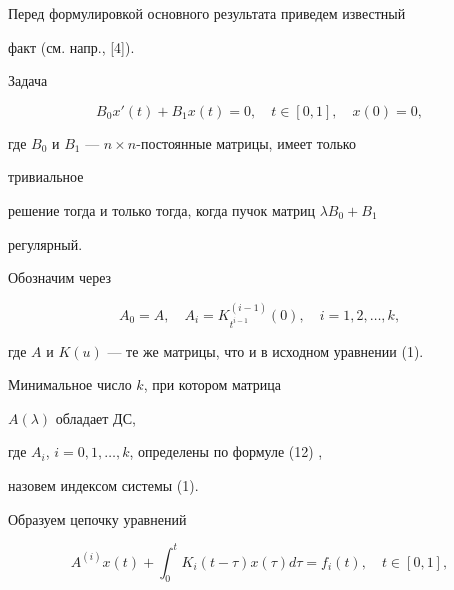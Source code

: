 Перед формулировкой основного результата приведем известный 


факт (см. напр., [4]). 


 


\begin{lem} Задача 


$$ 


B_0x'(t)+B_1x(t)=0,\quad t\in[0,1],\quad x(0)=0, 


$$ 


где $B_0$ и $B_1$ --- $n\times n$-постоянные матрицы, имеет только 


тривиальное 


решение тогда и только тогда, когда пучок матриц $\lambda B_0+B_1$ 


регулярный. 


\end{lem} 


 


Обозначим через 


\begin{equation} 


A_0=A,\quad A_i=K^{(i-1)}_{t^{i-1}}(0),\quad 


i=1,2,\dotsc,k, 


\end{equation} 


где $A$ и $K(u)$ --- те же матрицы, что и в исходном уравнении (1). 


 


\begin{defn} Минимальное число $k$, при котором матрица 


$A(\lambda)$ обладает ДС, 


где $A_i$, $i=0,1,\dotsc,k$, определены по формуле (12) ,


назовем индексом системы (1). 


\end{defn} 


 


Образуем цепочку уравнений 


\begin{equation} 


A^{(i)}x(t)+\int^t_0 K_i(t-\tau)x(\tau)d\tau=f_i(t), 


\quad t\in[0,1], 


\end{equation} 



